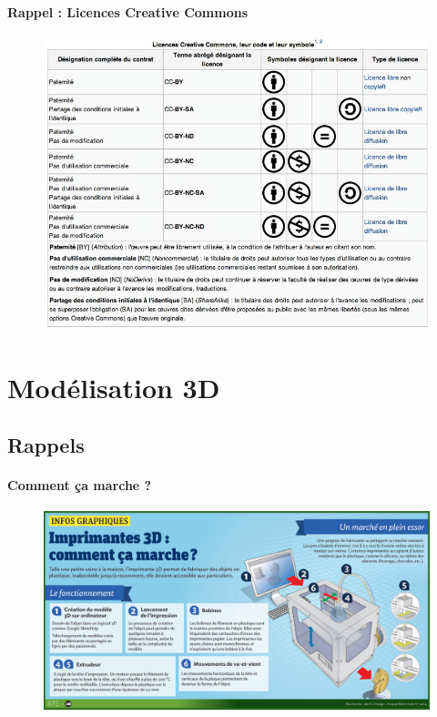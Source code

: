 \documentclass{article}
\begin{document}
\paragraph{Rappel : Licences Creative Commons}
 \par\leavevmode\par
\begin{figure}[h!]
\centering
\includegraphics[scale=0.42]{./images/licences.png}
\end{figure}\hfill 

\section{Modélisation 3D}
\subsection{Rappels}
\paragraph{Comment ça marche ?}
 \par\leavevmode\par
\begin{figure}[h!]
\centering
\includegraphics[scale=0.35]{./images/infographie.png}
\end{figure}\hfill
\end{document}
